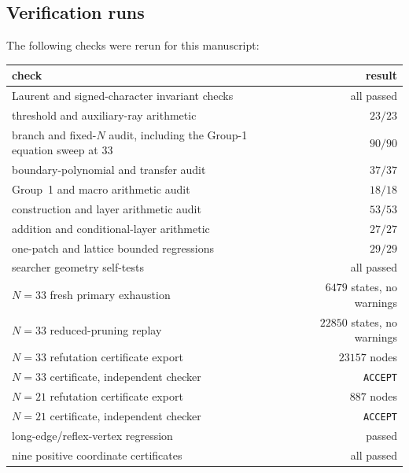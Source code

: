 \documentclass[11pt]{amsart}
\theoremstyle{definition}
\theoremstyle{remark}
\begin{document}
\subsection{Verification runs}

The following checks were rerun for this manuscript:
\begin{center}
\small
\begin{tabular}{@{}lr@{}}
\toprule
check & result \\
\midrule
Laurent and signed-character invariant checks & all passed \\
threshold and auxiliary-ray arithmetic & $23/23$ \\
branch and fixed-$N$ audit, including the Group-1 equation sweep at $33$ &
  $90/90$ \\
boundary-polynomial and transfer audit & $37/37$ \\
Group~1 and macro arithmetic audit & $18/18$ \\
construction and layer arithmetic audit & $53/53$ \\
addition and conditional-layer arithmetic & $27/27$ \\
one-patch and lattice bounded regressions & $29/29$ \\
searcher geometry self-tests & all passed \\
$N=33$ fresh primary exhaustion & $6479$ states, no warnings \\
$N=33$ reduced-pruning replay & $22850$ states, no warnings \\
$N=33$ refutation certificate export & $23157$ nodes \\
$N=33$ certificate, independent checker & \texttt{ACCEPT} \\
$N=21$ refutation certificate export & $887$ nodes \\
$N=21$ certificate, independent checker & \texttt{ACCEPT} \\
long-edge/reflex-vertex regression & passed \\
nine positive coordinate certificates & all passed \\
\bottomrule
\end{tabular}
\end{center}
\end{document}

